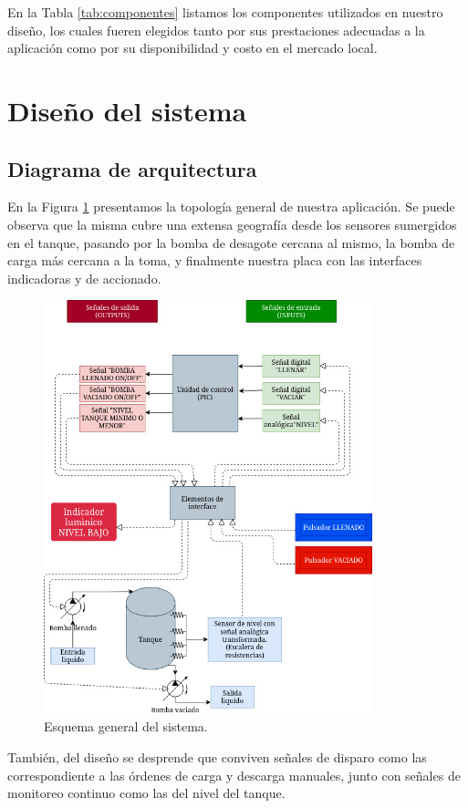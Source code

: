 ﻿\documentclass[a4paper]{article}
\begin{document}
En la Tabla \ref{tab:componentes} listamos los componentes 
utilizados en nuestro diseño, los cuales fueren elegidos tanto 
por sus prestaciones adecuadas a la aplicación como por su 
disponibilidad y costo en el mercado local.

\section{Diseño del sistema}

\subsection{Diagrama de arquitectura}

En la Figura \ref{fig:general} presentamos la topología 
general de nuestra aplicación. Se puede observa que 
la misma cubre una extensa geografía desde los sensores 
sumergidos en el tanque, pasando por la bomba de desagote
cercana al mismo, la bomba de carga más cercana a la toma,
y finalmente nuestra placa con las interfaces indicadoras 
y de accionado. 

\begin{figure}[h]\centering
    \includegraphics[height=12cm]{diagrama_sistema.jpg}
    \caption{Esquema general del sistema.}\label{fig:general}
\end{figure}

También, del diseño se desprende que conviven señales de 
disparo como las correspondiente a las órdenes de carga y
descarga manuales, junto con señales de monitoreo continuo
como las del nivel del tanque.
\end{document}
